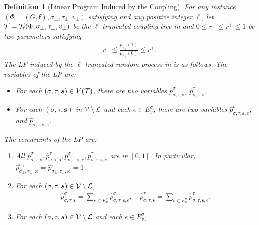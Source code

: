 \documentclass[11pt]{article}
\newtheorem{definition}[theorem]{Definition}
\newcommand{\vecf}{\boldsymbol{f}}
\newcommand{\seqS}{\boldsymbol{s}}
\begin{document}

\begin{definition}[Linear Program Induced by the Coupling] \label{def:induced-LP}
    For any instance $\left(\Phi = (G, \vecf),  \sigma_\bot, \tau_\bot,v_{\bot}\right)$ satisfying  and  any positive integer $\ell$, 
    let $\mathcal{T} = \mathcal{T}_{\ell}(\Phi, \sigma_\bot, \tau_\bot, v_\bot)$ be the $\ell$-truncated coupling tree in  and $0 \leq r^- \leq r^+\leq 1$ be two parameters satisfying
    \begin{align*}
        r^- \leq \frac{\mu_{e_{\bot}}(1)}{\mu_{e_{\bot}}(0)} \leq r^+.
    \end{align*}
    The LP induced by the $\ell$-truncated random process in  is as follows.
    The variables of the LP are:
    \begin{itemize}
    \item For each $(\sigma, \tau, \seqS) \in V(\+T)$, there are two variables $\widehat{p}_{\sigma, \tau, \seqS}^{\sigma}$, $\widehat{p}_{\sigma,\tau, \seqS}^{\tau}$.
    \item For each $(\sigma,\tau,\seqS)$ in $\mathcal{V}\setminus \mathcal{L}$ and each $e\in E_v^{\sigma}$, there are two variables $\widehat{p}_{\sigma,\tau,\seqS,e}^{\sigma}$, and $\widehat{p}_{\sigma,\tau,\seqS,e}^{\tau}$.
    \end{itemize}
    The constraints of the LP are:
    \begin{enumerate}
        \item All $\widehat{p}^{\sigma}_{\sigma, \tau, \seqS}, \widehat{p}^{\tau}_{\sigma, \tau, \seqS},\widehat{p}^{\sigma}_{\sigma, \tau, \seqS,e}, \widehat{p}^{\tau}_{\sigma, \tau, \seqS,e}$ are in $[0, 1]$. In particular, $\widehat{p}^{\sigma_\bot}_{\sigma_\bot,\tau_\bot, \varnothing}=\widehat{p}^{\tau_\bot}_{\sigma_\bot,\tau_\bot,\varnothing} = 1$.\label{item-first-LP}
        \item For each $(\sigma, \tau, \seqS)\in \+V\setminus\+L$, 
            \begin{align}\label{eqn-hat-inter-sum1}
               \widehat{p}^{\sigma}_{\sigma, \tau, \seqS} = \sum_{e \in  E_v^{\sigma}} \widehat{p}^{\sigma}_{\sigma, \tau, \seqS, e}, \quad  \widehat{p}^{\tau}_{\sigma,\tau, \seqS}=\sum_{e\in  E_v^{\sigma}} \widehat{p}^{\tau}_{\sigma,\tau, \seqS,e}.
            \end{align}
        \item For each $(\sigma, \tau, \seqS)\in \+V\setminus\+L$ and each $e\in E_v^{\sigma}$,

\end{enumerate}
\end{definition}
\end{document}
